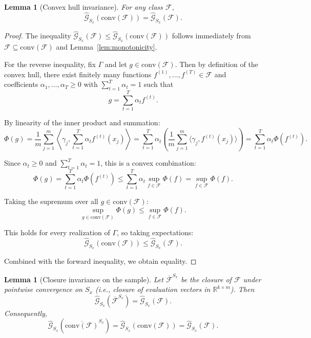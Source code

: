\documentclass{article}
\theoremstyle{plain}
\newtheorem{lemma}[theorem]{Lemma}
\theoremstyle{definition}
\theoremstyle{remark}
\begin{document}
\begin{lemma}[Convex hull invariance]
\label{lem:convex_hull_invariance}
For any class $\mathcal{F}$,
\[
\hat{\mathcal{G}}_{S_x}(\mathrm{conv}(\mathcal{F})) = \hat{\mathcal{G}}_{S_x}(\mathcal{F}).
\]
\end{lemma}

\begin{proof}
The inequality $\hat{\mathcal{G}}_{S_x}(\mathcal{F}) \le \hat{\mathcal{G}}_{S_x}(\mathrm{conv}(\mathcal{F}))$ follows immediately from $\mathcal{F}\subseteq \mathrm{conv}(\mathcal{F})$ and Lemma~\ref{lem:monotonicity}.

For the reverse inequality, fix $\Gamma$ and let $g\in\mathrm{conv}(\mathcal{F})$. Then by definition of the convex hull, there exist finitely many functions $f^{(1)},\ldots,f^{(T)}\in\mathcal{F}$ and coefficients $\alpha_1,\ldots,\alpha_T\ge 0$ with $\sum_{t=1}^T\alpha_t=1$ such that
\[
g = \sum_{t=1}^T \alpha_t f^{(t)}.
\]

By linearity of the inner product and summation:
\[
\Phi(g) = \frac{1}{m}\sum_{j=1}^m \left\langle \gamma_j, \sum_{t=1}^T \alpha_t f^{(t)}(x_j)\right\rangle
= \sum_{t=1}^T \alpha_t \left(\frac{1}{m}\sum_{j=1}^m \langle \gamma_j, f^{(t)}(x_j)\rangle\right)
= \sum_{t=1}^T \alpha_t \Phi(f^{(t)}).
\]

Since $\alpha_t\ge 0$ and $\sum_{t=1}^T\alpha_t=1$, this is a convex combination:
\[
\Phi(g) = \sum_{t=1}^T \alpha_t \Phi(f^{(t)}) \le \sum_{t=1}^T \alpha_t \sup_{f\in\mathcal{F}}\Phi(f) = \sup_{f\in\mathcal{F}}\Phi(f).
\]

Taking the supremum over all $g\in\mathrm{conv}(\mathcal{F})$:
\[
\sup_{g\in\mathrm{conv}(\mathcal{F})}\Phi(g) \le \sup_{f\in\mathcal{F}}\Phi(f).
\]

This holds for every realization of $\Gamma$, so taking expectations:
\[
\hat{\mathcal{G}}_{S_x}(\mathrm{conv}(\mathcal{F})) \le \hat{\mathcal{G}}_{S_x}(\mathcal{F}).
\]

Combined with the forward inequality, we obtain equality.
\end{proof}

\begin{lemma}[Closure invariance on the sample]
\label{lem:closure_invariance}
Let $\overline{\mathcal{F}}^{S_x}$ be the closure of $\mathcal{F}$ under pointwise convergence on $S_x$ (i.e., closure of evaluation vectors in $\mathbb{R}^{k\times m}$). Then
\[
\hat{\mathcal{G}}_{S_x}(\overline{\mathcal{F}}^{S_x}) = \hat{\mathcal{G}}_{S_x}(\mathcal{F}).
\]
Consequently,
\[
\hat{\mathcal{G}}_{S_x}(\overline{\mathrm{conv}(\mathcal{F})}^{S_x})
=
\hat{\mathcal{G}}_{S_x}(\mathrm{conv}(\mathcal{F}))
=
\hat{\mathcal{G}}_{S_x}(\mathcal{F}).
\]
\end{lemma}
\end{document}
